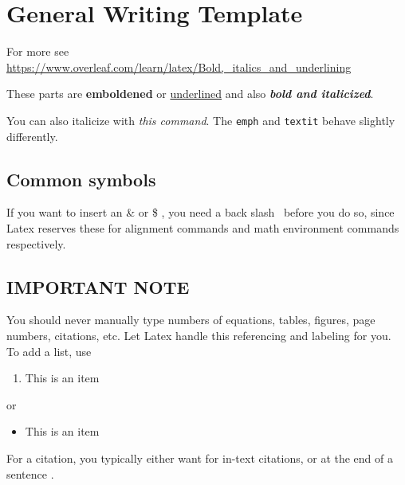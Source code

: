 \section{General Writing Template}


For more see \url{https://www.overleaf.com/learn/latex/Bold,_italics_and_underlining}


These parts are \textbf{emboldened} 
or \underline{underlined} 
and also \textbf{\textit{bold and italicized}}.

You can also italicize with \emph{this command}. The \verb+emph+ and \verb+textit+ behave slightly differently.

\subsection{Common symbols}

If you want to insert an \& or \$ , you need a back slash \ before you do so, since Latex reserves these for alignment commands and math environment commands respectively.



\subsection{IMPORTANT NOTE}
You should never manually type numbers of equations, tables, figures, page numbers, citations, etc. Let Latex handle this referencing and labeling for you.\\

To add a list, use

\begin{enumerate}
    \item This is an item
\end{enumerate}

or 

\begin{itemize}
    \item This is an item
\end{itemize}

For a citation, you typically either want \citet{taylorBuffaloHuntInternational2011} for in-text citations, or at the end of a sentence \citep{taylorBuffaloHuntInternational2011}.